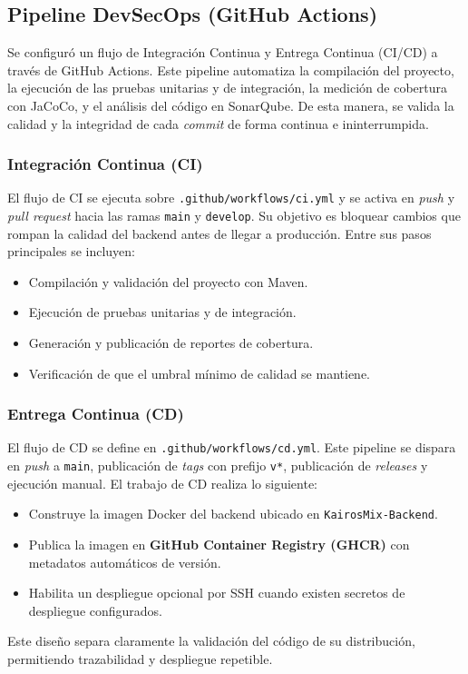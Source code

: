 \documentclass[12pt,a4paper]{article}
\begin{document}
\subsection{Pipeline DevSecOps (GitHub Actions)}
Se configuró un flujo de Integración Continua y Entrega Continua (CI/CD) a través de GitHub Actions. Este pipeline automatiza la compilación del proyecto, la ejecución de las pruebas unitarias y de integración, la medición de cobertura con JaCoCo, y el análisis del código en SonarQube. De esta manera, se valida la calidad y la integridad de cada \textit{commit} de forma continua e ininterrumpida.

\subsubsection{Integración Continua (CI)}
El flujo de CI se ejecuta sobre \texttt{.github/workflows/ci.yml} y se activa en \textit{push} y \textit{pull request} hacia las ramas \texttt{main} y \texttt{develop}. Su objetivo es bloquear cambios que rompan la calidad del backend antes de llegar a producción. Entre sus pasos principales se incluyen:
\begin{itemize}
    \item Compilación y validación del proyecto con Maven.
    \item Ejecución de pruebas unitarias y de integración.
    \item Generación y publicación de reportes de cobertura.
    \item Verificación de que el umbral mínimo de calidad se mantiene.
\end{itemize}

\subsubsection{Entrega Continua (CD)}
El flujo de CD se define en \texttt{.github/workflows/cd.yml}. Este pipeline se dispara en \textit{push} a \texttt{main}, publicación de \textit{tags} con prefijo \texttt{v*}, publicación de \textit{releases} y ejecución manual. El trabajo de CD realiza lo siguiente:
\begin{itemize}
    \item Construye la imagen Docker del backend ubicado en \texttt{KairosMix-Backend}.
    \item Publica la imagen en \textbf{GitHub Container Registry (GHCR)} con metadatos automáticos de versión.
    \item Habilita un despliegue opcional por SSH cuando existen secretos de despliegue configurados.
\end{itemize}
Este diseño separa claramente la validación del código de su distribución, permitiendo trazabilidad y despliegue repetible.
\end{document}
